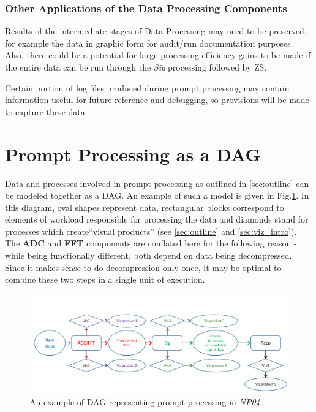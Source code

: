 \documentclass[pdftex,12pt,letter]{article}
\newcommand{\expname}{\textit{NP04}\xspace}
\begin{document}
\subsubsection{Other Applications of the Data Processing Components}
Results of the intermediate stages of Data Processing may need to be preserved, for
example the data in graphic form for audit/run documentation purposes.
Also, there could be a potential for large processing efficiency
gains to be made if the entire data can be run through the \textit{Sig} processing followed by ZS.

Certain portion of log files produced during prompt processing may contain information useful
for future reference and debugging, so provisions will be made to capture these data.


\section{Prompt Processing as a DAG}
\label{sec:dag}
Data and processes involved in prompt processing as outlined in \ref{sec:outline} can be
modeled together as a DAG. An example of such a model is given in Fig.\ref{fig:dag1}.
In this diagram, oval shapes represent data, rectangular blocks correspond to
elements of workload responsible for processing the data and diamonds stand for processes
which create``visual products'' (see \ref{sec:outline} and \ref{sec:viz_intro}).
The \textbf{ADC} and \textbf{FFT} components are conflated here for the following reason - while being functionally
different, both depend on data being decompressed. Since it makes sense to do decompression only once, it may
be optimal to combine these two steps in a single unit of execution.


\begin{figure}[tbh]
  \centering
  \includegraphics[width=1.0\textwidth]{figures/prompt_dag_2.pdf}
  \caption{An example of DAG representing prompt processing in \expname.}
  \label{fig:dag1}
\end{figure}
\end{document}
